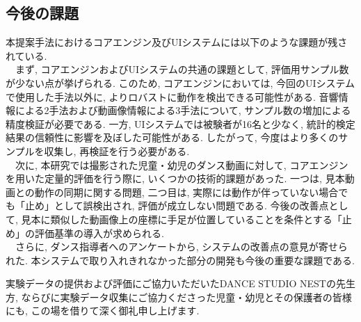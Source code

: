 \documentclass[paper]{ieicej}
\begin{document}
\subsection{今後の課題}
本提案手法におけるコアエンジン及びUIシステムには以下のような課題が残されている. \\
　まず, コアエンジンおよびUIシステムの共通の課題として, 評価用サンプル数が少ない点が挙げられる. このため, コアエンジンにおいては, 今回のUIシステムで使用した手法以外に, よりロバストに動作を検出できる可能性がある. 音響情報による2手法および動画像情報による3手法について, サンプル数の増加による精度検証が必要である. 一方, UIシステムでは被験者が16名と少なく, 統計的検定結果の信頼性に影響を及ぼした可能性がある. したがって, 今度はより多くのサンプルを収集し, 再検証を行う必要がある. \\
　次に, 本研究では撮影された児童・幼児のダンス動画に対して, コアエンジンを用いた定量的評価を行う際に, いくつかの技術的課題があった. 一つは, 見本動画との動作の同期に関する問題, 二つ目は, 実際には動作が伴っていない場合でも「止め」として誤検出され, 評価が成立しない問題である. 今後の改善点として, 見本に類似した動画像上の座標に手足が位置していることを条件とする「止め」の評価基準の導入が求められる.\\
　さらに, ダンス指導者へのアンケートから, システムの改善点の意見が寄せられた. 本システムで取り入れきれなかった部分の開発も今後の重要な課題である. 

\ack %
実験データの提供および評価にご協力いただいたDANCE STUDIO NESTの先生方, ならびに実験データ収集にご協力くださった児童・幼児とその保護者の皆様にも, この場を借りて深く御礼申し上げます. 





\end{document}
